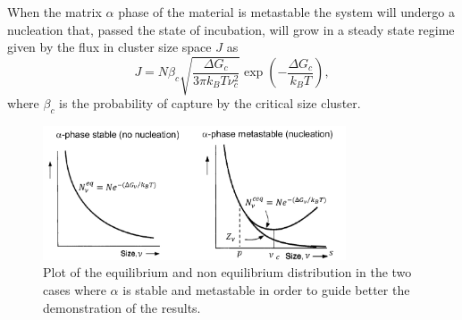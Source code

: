 {
    When the matrix $\alpha$ phase of the material is metastable the system will undergo a nucleation that, passed the state of incubation, will grow in a steady state regime given by the flux in cluster size space $J$ as
    \begin{equation}
        \label{eq:SteadyStateFlux}
        J = N\beta_c \sqrt{\frac{\Delta G_c}{3\pi k_BT\nu_c^2}}\exp\left( -\frac{\Delta G_c}{k_BT} \right),
    \end{equation}
    where $\beta_c$ is the probability of capture by the critical size cluster.
}
\begin{figure}[t]
    \centering
    \includegraphics[width=0.8\textwidth]{Immagini/DistributionsGrains.png}
    \caption
    {
        Plot of the equilibrium and non equilibrium distribution in the two cases where $\alpha$ is stable and metastable in order to guide better the demonstration of the results.
    }
    \label{fig:DistributionsGrains}
\end{figure}
